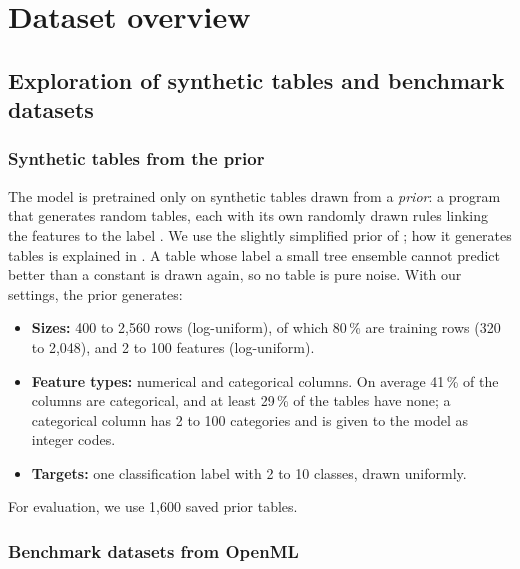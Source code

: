 \section{Dataset overview}\label{sec:data}

\subsection{Exploration of synthetic tables and benchmark datasets}\label{sec:exploration}

\subsubsection{Synthetic tables from the prior}\label{sec:prior_tables}

The model is pretrained only on synthetic tables drawn from a \emph{prior}:
a program that generates random tables, each with its own randomly drawn
rules linking the features to the label \citep{muller2022pfn,qu2026tabiclv2}.
We use the slightly simplified prior of \nanotabicl{} \citep{nanotabicl}; how
it generates tables is explained in . A table whose label a
small tree ensemble cannot predict better than a constant is drawn again,
so no table is pure noise. With our settings, the prior generates:
\begin{itemize}
  \item \textbf{Sizes:} 400 to 2{,}560 rows (log-uniform), of which 80\,\%
    are training rows (320 to 2{,}048), and 2 to 100 features
    (log-uniform).
  \item \textbf{Feature types:} numerical and categorical columns. On
    average 41\,\% of the columns are categorical, and at least 29\,\% of
    the tables have none; a categorical column has 2 to 100 categories and
    is given to the model as integer codes.
  \item \textbf{Targets:} one classification label with 2 to 10 classes,
    drawn uniformly.
\end{itemize}
For evaluation, we use 1{,}600 saved prior tables.

\subsubsection{Benchmark datasets from OpenML}\label{sec:real_tables}

